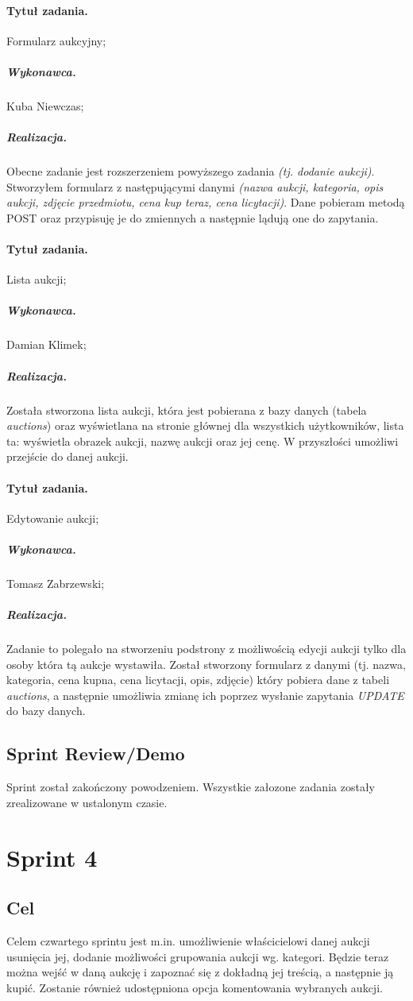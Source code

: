 \documentclass[a4paper]{article}
\begin{document}
	\paragraph{Tytuł zadania.} Formularz aukcyjny;
	\subparagraph{Wykonawca.} Kuba Niewczas;
	\subparagraph{Realizacja.} Obecne zadanie jest rozszerzeniem powyższego zadania \emph{(tj. dodanie aukcji)}. Stworzyłem formularz z następującymi danymi \emph{(nazwa aukcji, kategoria, opis aukcji, zdjęcie przedmiotu, cena kup teraz, cena licytacji)}. Dane pobieram metodą POST oraz przypisuję je do zmiennych a następnie lądują one do zapytania. 
	
	\paragraph{Tytuł zadania.} Lista aukcji;
	\subparagraph{Wykonawca.} Damian Klimek;
	\subparagraph{Realizacja.} Została stworzona lista aukcji, która jest pobierana z bazy danych (tabela \emph{auctions}) oraz wyświetlana na stronie głównej dla wszystkich użytkowników, lista ta: wyświetla obrazek aukcji, nazwę aukcji oraz jej cenę. W przyszłości umożliwi przejście do danej aukcji.
	
	\paragraph{Tytuł zadania.} Edytowanie aukcji;
	\subparagraph{Wykonawca.} Tomasz Zabrzewski;
	\subparagraph{Realizacja.} Zadanie to polegało na stworzeniu podstrony z możliwością edycji aukcji tylko dla osoby która tą aukcje wystawiła. Został stworzony formularz z danymi (tj. nazwa, kategoria, cena kupna, cena licytacji, opis, zdjęcie) który pobiera dane z tabeli \emph{auctions}, a następnie umożliwia zmianę ich poprzez wysłanie zapytania \emph{UPDATE} do bazy danych.
	
	\subsection{Sprint Review/Demo}
	Sprint został zakończony powodzeniem. Wszystkie załozone zadania zostały zrealizowane w ustalonym czasie.
	
	\section{Sprint 4}
	
	\subsection{Cel} Celem czwartego sprintu jest m.in. umożliwienie właścicielowi danej aukcji usunięcia jej, dodanie możliwości grupowania aukcji wg. kategori. Będzie teraz można wejść w daną aukcję i zapoznać się z dokładną jej treścią, a następnie ją kupić. Zostanie również udostępniona opcja komentowania wybranych aukcji.
	
\end{document}
